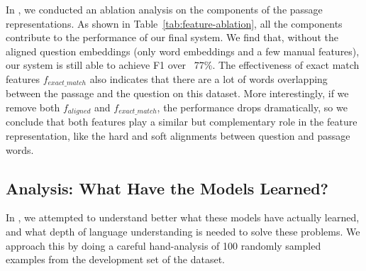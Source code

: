 In , we conducted an ablation analysis on the components of the passage representations. As shown in Table~\ref{tab:feature-ablation}, all the components contribute to the performance of our final system. We find that, without the aligned question embeddings (only word embeddings and a few manual features), our system is still able to achieve F1 over ~77\%. The effectiveness of exact match features $f_{exact\_match}$ also indicates that there are a lot of words overlapping between the passage and the question on this dataset. More interestingly, if we remove both $f_{aligned}$ and $f_{exact\_match}$, the performance drops dramatically, so we conclude that both features play a similar but complementary role in the feature representation, like the hard and soft alignments between question and passage words.



\subsection{Analysis: What Have the Models Learned?}

In , we attempted to understand better what these models have actually learned, and what depth of language understanding is needed to solve these problems. We approach this by doing a careful hand-analysis of 100 randomly sampled examples from the development set of the  dataset.


